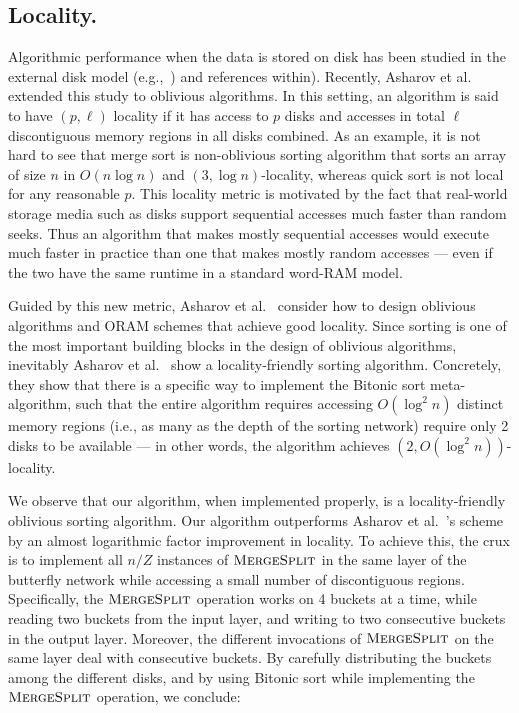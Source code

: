 \subsection{Locality.}
\label{sec:locality}
Algorithmic performance when the data is stored on disk has been studied in the external disk model (e.g.,~\cite{RuemmlerW94,ArgeFGV97,Vitter01,Vitter06}) and references within). Recently, Asharov et al.~\cite{AsharovCNPRS19} extended this study to oblivious algorithms. In this setting, an algorithm 
is said to have $(p, \ell)$ locality if it has access 
to $p$ disks and 
accesses in total $\ell$ discontiguous memory regions in all disks combined. As an example, it is not hard to see that merge sort is non-oblivious sorting algorithm that sorts an array of size $n$ in $O(n \log n)$ and $(3,\log n)$-locality, whereas quick sort  is not local for any reasonable $p$. 
This locality metric is motivated by the fact that real-world storage
media such as disks support sequential accesses
much faster than random seeks. Thus an algorithm that 
makes mostly sequential accesses would execute much faster in practice than one that  
makes mostly random accesses --- even if the two have the same runtime in a standard
word-RAM model. 

Guided by this new metric, Asharov et al.~\cite{AsharovCNPRS19} consider how to design oblivious algorithms and ORAM schemes that achieve good locality. 
Since sorting is one of the most important
building blocks in the 
design of oblivious algorithms, 
inevitably Asharov et al.~\cite{AsharovCNPRS19}
show a locality-friendly sorting algorithm.
Concretely, they show that there is a specific way to implement
the Bitonic sort meta-algorithm,
such that the entire algorithm requires accessing 
$O(\log^2 n)$ distinct memory regions (i.e., as many as the depth of the sorting network) 
require only 2 disks to be available --- in other words,
the algorithm achieves $(2, O(\log^2 n))$-locality.

We observe that our algorithm, when implemented properly, is a locality-friendly oblivious sorting algorithm. 
Our algorithm 
outperforms Asharov et al.~\cite{AsharovCNPRS19}'s  scheme 
by an almost logarithmic 
factor improvement in locality. %
To achieve this, the crux is to implement all $n/Z$ instances of 
$\textsc{MergeSplit}$ in the same layer of the butterfly network 
while accessing a small number of discontiguous regions. Specifically, the $\textsc{MergeSplit}$ operation works on 4 buckets at a time, while reading two buckets from the input layer, and writing to two consecutive buckets in the output layer. Moreover, the different invocations of $\textsc{MergeSplit}$ on the same layer deal with consecutive buckets. By carefully distributing the buckets among the different disks, and by using Bitonic sort while implementing the $\textsc{MergeSplit}$ operation, we conclude:

